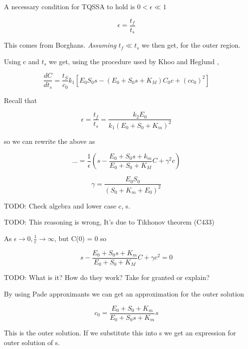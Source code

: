 \documentclass[12pt]{article}
\begin{document}
A necessary condition for TQSSA to hold is $0 < \epsilon \ll 1$

\begin{equation}
\epsilon = \frac{t_f}{t_s}
\end{equation}

This comes from Borghans. \textit{Assuming} $t_f \ll t_s$ we then get, for the
outer region.

Using c and $t_s$ we get, using the procedure used by Khoo and Heglund
\cite{khoo2008total},

\begin{equation}
\frac{dC}{dt_s} = \frac{t_{\overline{S}}}{c_0} k_1 [E_0 S_0 s - (E_0 + S_0 s +
K_M) C_0 c + (c c_0)^2]
\end{equation}

Recall that

\begin{equation}
\epsilon = \frac{t_f}{t_s} = \frac{k_2 E_0}{k_1(E_0+S_0+K_m)^2}
\end{equation}

so we can rewrite the above as

\begin{equation}
... = \frac{1}{\epsilon} (s - \frac{E_0+S_0 s + k_m}{E_0 + S_0+ K_M}C + \gamma^2
c)
\end{equation}

\begin{equation}
\gamma = \frac{E_0 S_0}{(S_0 + K_m + E_0)^2}
\end{equation}

TODO: Check algebra and lower case c, s.

TODO: This reasoning is wrong, It's due to Tikhonov theorem (C433)

As $\epsilon \to 0, \frac{1}{\epsilon} \to \infty$, but C(0) = 0 so

\begin{equation}
s - \frac{E_0 + S_0 s + K_m}{E_0 + S_0 + K_M}C + \gamma c^2 = 0
\end{equation}

TODO: What is it? How do they work? Take for granted or explain?

By using Pade approximants we can get an approximation for the outer
solution

\begin{equation}
c_0  = \frac{E_0 + S_0 + K_m}{E_0 + S_0 s + K_m} s
\end{equation}

This is the outer solution. If we substitute this into s we get an
expression for outer solution of s.
\end{document}
